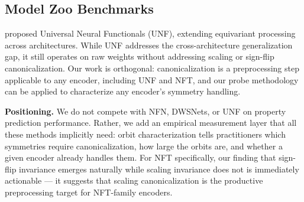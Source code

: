 \subsection{Model Zoo Benchmarks}

\citet{Kofinas2024UniversalNeuralFunctionals} proposed Universal Neural Functionals (UNF), extending equivariant processing across architectures. While UNF addresses the cross-architecture generalization gap, it still operates on raw weights without addressing scaling or sign-flip canonicalization. Our work is orthogonal: canonicalization is a preprocessing step applicable to any encoder, including UNF and NFT, and our probe methodology can be applied to characterize any encoder's symmetry handling.

\textbf{Positioning.} We do not compete with NFN, DWSNets, or UNF on property prediction performance. Rather, we add an empirical measurement layer that all these methods implicitly need: orbit characterization tells practitioners which symmetries require canonicalization, how large the orbits are, and whether a given encoder already handles them. For NFT specifically, our finding that sign-flip invariance emerges naturally while scaling invariance does not is immediately actionable --- it suggests that scaling canonicalization is the productive preprocessing target for NFT-family encoders.
